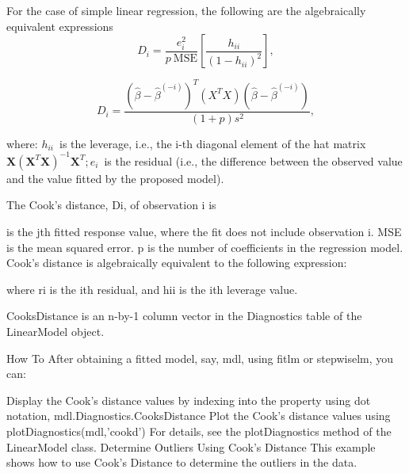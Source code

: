 \documentclass[residuals.tex]{subfiles}
\begin{document}
For the case of simple linear regression, the following are the algebraically equivalent expressions 
\[D_i = \frac{e_i^2}{p \ \mathrm{MSE}}\left[\frac{h_{ii}}{(1-h_{ii})^2}\right],
\]

\[
D_i = \frac{ (\hat \beta - \hat {\beta}^{(-i)})^T(X^TX)(\hat \beta - \hat {\beta}^{(-i)}) } {(1+p)s^2},
\]

where:
$h_{ii} \,$ is the leverage, i.e., the i-th diagonal element of the hat matrix $\mathbf{X}\left(\mathbf{X}^T\mathbf{X}\right)^{-1}\mathbf{X}^T;
e_i \,$ is the residual (i.e., the difference between the observed value and the value fitted by the proposed model).


\newpage
The Cook's distance, Di, of observation i is


 is the jth fitted response value, where the fit does not include observation i.
MSE is the mean squared error.
p is the number of coefficients in the regression model.
Cook's distance is algebraically equivalent to the following expression:


where ri is the ith residual, and hii is the ith leverage value.

CooksDistance is an n-by-1 column vector in the Diagnostics table of the LinearModel object.

How To
After obtaining a fitted model, say, mdl, using fitlm or stepwiselm, you can:

Display the Cook's distance values by indexing into the property using dot notation,
mdl.Diagnostics.CooksDistance
Plot the Cook's distance values using
plotDiagnostics(mdl,'cookd')
For details, see the plotDiagnostics method of the LinearModel class.
Determine Outliers Using Cook's Distance
This example shows how to use Cook's Distance to determine the outliers in the data.
\end{document}
